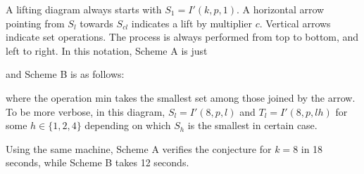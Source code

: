\documentclass[11pt]{amsart}
\theoremstyle{definition}
\theoremstyle{remark}
\begin{document}
A lifting diagram always starts with $S_1=I'(k,p,1)$. A horizontal arrow pointing from $S_l$ towards $S_{cl}$ indicates a lift by multiplier $c$.
Vertical arrows indicate set operations. 
The process is always performed from top to bottom, and left to right. In this notation, Scheme A is just 
\begin{center}
\end{center}
and Scheme B is as follows:
\begin{center}
\end{center}
where the operation min takes the smallest set among those joined by the arrow. 
To be more verbose, in this diagram, $S_l = I'(8,p,l)$ and $T_l=I'(8,p,lh)$ for some $h\in\{1,2,4\}$ depending 
on which $S_h$ is the smallest in certain case.

Using the same machine, Scheme A verifies the conjecture for $k=8$ in 18 seconds, while Scheme B takes 12 seconds.
\end{document}

